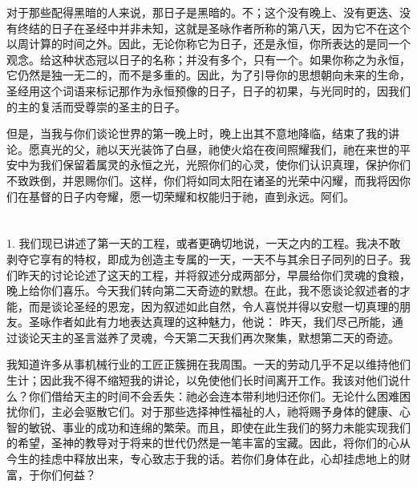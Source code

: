 对于那些配得黑暗的人来说，那日子是黑暗的。不；这个没有晚上、没有更迭、没有终结的日子在圣经中并非未知，这就是圣咏作者所称的第八天，因为它不在这个以周计算的时间之外。因此，无论你称它为日子，还是永恒，你所表达的是同一个观念。给这种状态冠以日子的名称；并没有多个，只有一个。如果你称之为永恒，它仍然是独一无二的，而不是多重的。因此，为了引导你的思想朝向未来的生命，圣经用这个词语来标记那作为永恒预像的日子，日子的初果，与光同时的，因我们的主的复活而受尊崇的圣主的日子。\par

但是，当我与你们谈论世界的第一晚上时，晚上出其不意地降临，结束了我的讲论。愿真光的父，祂以天光装饰了白昼，祂使火焰在夜间照耀我们，祂在来世的平安中为我们保留着属灵的永恒之光，光照你们的心灵，使你们认识真理，保护你们不致跌倒，并恩赐你们。这样，你们将如同太阳在诸圣的光荣中闪耀，而我将因你们在基督的日子内夸耀，愿一切荣耀和权能归于祂，直到永远。阿们。\par



\section{}

\par

1. 我们现已讲述了第一天的工程，或者更确切地说，一天之内的工程。我决不敢剥夺它享有的特权，即成为创造主专属的一天，一天不与其余日子同列的日子。我们昨天的讨论论述了这天的工程，并将叙述分成两部分，早晨给你们灵魂的食粮，晚上给你们喜乐。今天我们转向第二天奇迹的默想。在此，我不愿谈论叙述者的才能，而是谈论圣经的恩宠，因为叙述如此自然，令人喜悦并得以安慰一切真理的朋友。圣咏作者如此有力地表达真理的这种魅力，他说： 昨天，我们尽己所能，通过谈论天主的圣言滋养了灵魂，今天第二天我们再次聚集，默想第二天的奇迹。\par

我知道许多从事机械行业的工匠正簇拥在我周围。一天的劳动几乎不足以维持他们生计；因此我不得不缩短我的讲论，以免使他们长时间离开工作。我该对他们说什么？你们借给天主的时间不会丢失：祂必会连本带利地归还你们。无论什么困难困扰你们，主必会驱散它们。对于那些选择神性福祉的人，祂将赐予身体的健康、心智的敏锐、事业的成功和连绵的繁荣。而且，即使在此生我们的努力未能实现我们的希望，圣神的教导对于将来的世代仍然是一笔丰富的宝藏。因此，将你们的心从今生的挂虑中释放出来，专心致志于我的话。若你们身体在此，心却挂虑地上的财富，于你们何益？\par

